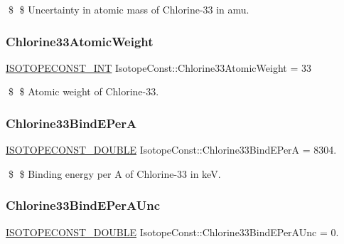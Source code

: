 \$ \$ Uncertainty in atomic mass of Chlorine-\/33 in amu. \mbox{\label{group___isotope_const-_chlorine-_cl33_ga537e672dc94be5e5972df9fff38e0579}} 
\subsubsection{\texorpdfstring{Chlorine33\+Atomic\+Weight}{Chlorine33AtomicWeight}}
{\footnotesize\ttfamily \mbox{\hyperlink{group___isotope_const-_macros_ga5f18360b3e99483a35c32d789e62621c}{I\+S\+O\+T\+O\+P\+E\+C\+O\+N\+S\+T\+\_\+\+I\+NT}} Isotope\+Const\+::\+Chlorine33\+Atomic\+Weight = 33}

\$ \$ Atomic weight of Chlorine-\/33. \mbox{\label{group___isotope_const-_chlorine-_cl33_ga4df88e9908fb93568ae9fca2e746d021}} 
\subsubsection{\texorpdfstring{Chlorine33\+Bind\+E\+PerA}{Chlorine33BindEPerA}}
{\footnotesize\ttfamily \mbox{\hyperlink{group___isotope_const-_macros_ga8f45a7272ce02c0b4c65c44636ed719a}{I\+S\+O\+T\+O\+P\+E\+C\+O\+N\+S\+T\+\_\+\+D\+O\+U\+B\+LE}} Isotope\+Const\+::\+Chlorine33\+Bind\+E\+PerA = 8304.}

\$ \$ Binding energy per A of Chlorine-\/33 in keV. \mbox{\label{group___isotope_const-_chlorine-_cl33_gac4fbeb2ed54bd533bdffad21eae1698c}} 
\subsubsection{\texorpdfstring{Chlorine33\+Bind\+E\+Per\+A\+Unc}{Chlorine33BindEPerAUnc}}
{\footnotesize\ttfamily \mbox{\hyperlink{group___isotope_const-_macros_ga8f45a7272ce02c0b4c65c44636ed719a}{I\+S\+O\+T\+O\+P\+E\+C\+O\+N\+S\+T\+\_\+\+D\+O\+U\+B\+LE}} Isotope\+Const\+::\+Chlorine33\+Bind\+E\+Per\+A\+Unc = 0.}


